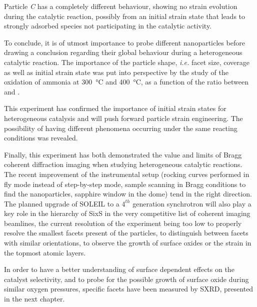 Particle \textit{C} has a completely different behaviour, showing no strain evolution during the catalytic reaction, possibly from an initial strain state that leads to strongly adsorbed species not participating in the catalytic activity.

To conclude, it is of utmost importance to probe different nanoparticles before drawing a conclusion regarding their global behaviour during a heterogeneous catalytic reaction.
The importance of the particle shape, \textit{i.e.} facet size, coverage as well as initial strain state was put into perspective by the study of the oxidation of ammonia at \qty{300}{\degreeCelsius} and \qty{400}{\degreeCelsius}, as a function of the ratio between  and .

This experiment has confirmed the importance of initial strain states for heterogeneous catalysis and will push forward particle strain engineering.
The possibility of having different phenomena occurring under the same reacting conditions was revealed.

Finally, this experiment has both demonstrated the value and limits of Bragg coherent diffraction imaging when studying heterogeneous catalytic reactions.
The recent improvement of the instrumental setup (rocking curves performed in fly mode instead of step-by-step mode, sample scanning in Bragg conditions to find the nanoparticles, sapphire window in the dome) tend in the right direction.
The planned upgrade of SOLEIL to a $4^{th}$ generation synchrotron will also play a key role in the hierarchy of SixS in the very competitive list of coherent imaging beamlines, the current resolution of the experiment being too low to properly resolve the smallest facets present of the particles, to distinguish between facets with similar orientations, to observe the growth of surface oxides or the strain in the topmost atomic layers.

In order to have a better understanding of surface dependent effects on the catalyst selectivity, and to probe for the possible growth of surface oxide during similar oxygen pressures, specific facets have been measured by SXRD, presented in the next chapter.